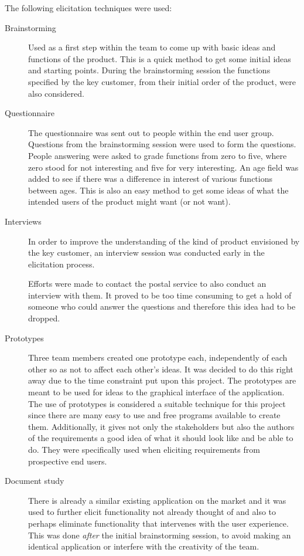 \documentclass[10pt,a4paper]{article}
\begin{document}
The following elicitation techniques were used:
\begin{description}
\item[Brainstorming] Used as a first step within the team to come up with basic ideas and functions of the product. This is a quick method to get some initial ideas and starting points. During the brainstorming session the functions specified by the key customer, from their initial order of the product, were also considered.

\item[Questionnaire] The questionnaire was sent out to people within the end user group. Questions from the brainstorming session were used to form the questions. People answering were asked to grade functions from zero to five, where zero stood for not interesting and five for very interesting. An age field was added to see if there was a difference in interest of various functions between ages. This is also an easy method to get some ideas of what the intended users of the product might want (or not want).

\item[Interviews] In order to improve the understanding of the kind of product envisioned by the key customer, an interview session was conducted early in the elicitation process.

Efforts were made to contact the postal service to also conduct an interview with them. It proved to be too time consuming to get a hold of someone who could answer the questions and therefore this idea had to be dropped.  

\item[Prototypes] Three team members created one prototype each, independently of each other so as not to affect each other's ideas. It was decided to do this right away due to the time constraint put upon this project. The prototypes are meant to be used for ideas to the graphical interface of the application. The use of prototypes is considered a suitable technique for this project since there are many easy to use and free programs available to create them. Additionally, it gives not only the stakeholders but also the authors of the requirements a good idea of what it should look like and be able to do. They were specifically used when eliciting requirements from prospective end users.

\item[Document study] There is already a similar existing application on the market and it was used to further elicit functionality not already thought of and also to perhaps eliminate functionality that intervenes with the user experience. This was done \textit{after} the initial brainstorming session, to avoid making an identical application or interfere with the creativity of the team. 

\end{description}
\end{document}
